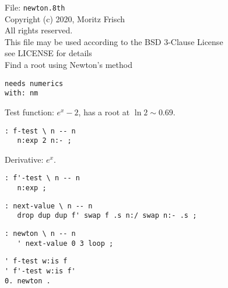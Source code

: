 \documentclass{article}
\begin{document}
 
File: \texttt{newton.8th} \\
Copyright (c) 2020, Moritz Frisch\\
All rights reserved.\\
This file may be used according to the BSD 3-Clause License\\
see LICENSE for details\\
 
Find a root using Newton's method\\
 
\begin{verbatim}
needs numerics
with: nm
\end{verbatim}
Test function: $e^x-2$, has a root at $\ln 2\sim 0.69$.
\begin{verbatim}
: f-test \ n -- n
   n:exp 2 n:- ;
\end{verbatim}
Derivative: $e^x$.
\begin{verbatim}
: f'-test \ n -- n
   n:exp ;
\end{verbatim}
\begin{verbatim}
: next-value \ n -- n
   drop dup dup f' swap f .s n:/ swap n:- .s ;
\end{verbatim}
\begin{verbatim}
: newton \ n -- n
   ' next-value 0 3 loop ;
\end{verbatim}
\begin{verbatim}
' f-test w:is f
' f'-test w:is f'
0. newton .
\end{verbatim}
\end{document}

